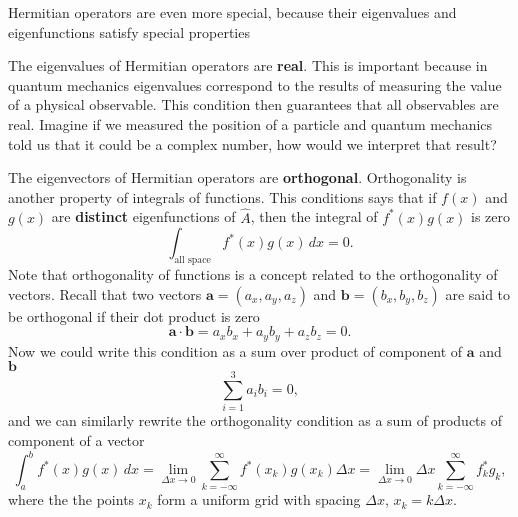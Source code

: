 \documentclass[../Main/chem331-notes.tex]{subfiles}
\begin{document}
Hermitian operators are even more special, because their eigenvalues and eigenfunctions satisfy special properties
\begin{ibox}
\begin{myitems}
\item The eigenvalues of Hermitian operators are \textbf{real}. This is important because in quantum mechanics eigenvalues correspond to the results of measuring the value of a physical observable. This condition then guarantees that all observables are real. Imagine if we measured the position of a particle and quantum mechanics told us that it could be a complex number, how would we interpret that result?
\item The eigenvectors of Hermitian operators are \textbf{orthogonal}. Orthogonality is another property of integrals of functions. This conditions says that if $f(x)$ and $g(x)$ are \textbf{distinct} eigenfunctions of $\hat{A}$, then the integral of $f^*(x)g(x)$ is zero
\begin{equation}
\int_\text{all space} f^*(x) g(x) \, dx = 0.
\end{equation}
Note that orthogonality of functions is a concept related to the orthogonality of vectors. Recall that two vectors $\mathbf{a} = (a_x, a_y, a_z)$ and $\mathbf{b} = (b_x, b_y, b_z)$ are said to be orthogonal if their dot product is zero
\begin{equation}
\mathbf{a} \cdot \mathbf{b} = a_x b_x + a_y b_y + a_z b_z = 0.
\end{equation}
Now we could write this condition as a sum over product of component of $\mathbf{a}$ and $\mathbf{b}$
\begin{equation}
\sum_{i = 1}^{3} a_i b_i = 0,
\end{equation}
and we can similarly rewrite the orthogonality condition as a sum of products of component of a vector
\begin{equation}
\int_a^b f^*(x) g(x) \, dx = \lim_{\Delta x \rightarrow 0} \sum_{k = -\infty}^{\infty} f^*(x_k) g(x_k) \Delta x
=\lim_{\Delta x \rightarrow 0}  \Delta x \sum_{k = -\infty}^{\infty} f^*_k g_k,
\end{equation}
where the the points $x_k$ form a uniform grid with spacing $\Delta x$, $x_k = k  \Delta x$.

\end{myitems}
\end{ibox}
\end{document}
